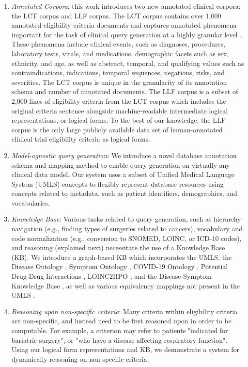 \documentclass[../main.tex]{subfiles}
\begin{document}
\begin{enumerate}
    \item \textit{Annotated Corpora}: this work introduces two new annotated clinical corpora: the LCT corpus and LLF corpus. The LCT corpus contains over 1,000 annotated eligibility criteria documents and captures annotated phenomena important for the task of clinical query generation at a highly granular level \cite{dobbins2022leaf}. These phenomena include clinical events, such as diagnoses, procedures, laboratory tests, vitals, and medications, demographic facets such as sex, ethnicity, and age, as well as abstract, temporal, and qualifying values such as contraindications, indications, temporal sequences, negations, risks, and severities. The LCT corpus is unique in the granularity of its annotation schema and number of annotated documents. The LLF corpus is a subset of 2,000 lines of eligibility criteria from the LCT corpus which includes the original criteria sentence alongside machine-readable intermediate logical representations, or logical forms. To the best of our knowledge, the LLF corpus is the only large publicly available data set of human-annotated clinical trial eligibility criteria as logical forms.
    \item \textit{Model-agnostic query generation}: We introduce a novel database annotation schema and mapping method to enable query generation on virtually any clinical data model. Our system uses a subset of Unified Medical Language System (UMLS) \cite{bodenreider2004unified} concepts to flexibly represent database resources using concepts related to metadata, such as patient identifiers, demographics, and vocabularies.
    \item \textit{Knowledge Base}: Various tasks related to query generation, such as hierarchy navigation (e.g., finding types of surgeries related to cancers), vocabulary and code normalization (e.g., conversion to SNOMED, LOINC, or ICD-10 codes), and reasoning (explained next) necessitate the use of a Knowledge Base (KB). We introduce a graph-based KB which incorporates the UMLS, the Disease Ontology \cite{schriml2012disease}, Symptom Ontology \cite{sayers2010database}, COVID-19 Ontology \cite{sargsyan2020covid}, Potential Drug-Drug Interactions \cite{ayvaz2015toward}, LOINC2HPO \cite{zhang2019semantic}, and the Disease-Symptom Knowledge Base \cite{wang2008automated}, as well as various equivalency mappings not present in the UMLS \cite{icd9_icd10_icd10pcs, icd9dx_snomed, icd9proc_snomed, snomed_icd10}.
    \item \textit{Reasoning upon non-specific criteria}: Many criteria within eligibility criteria are non-specific, and instead need to be first reasoned upon in order to be computable. For example, a criterion may refer to patients "indicated for bariatric surgery", or "who have a disease affecting respiratory function". Using our logical form representations and KB, we demonstrate a system for dynamically reasoning on non-specific criteria.

\end{enumerate}
\end{document}
